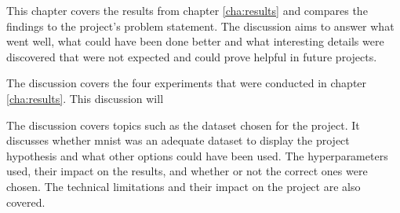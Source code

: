 This chapter covers the results from chapter \autoref{cha:results} and compares the findings to the project's problem statement. The discussion aims to answer what went well, what could have been done better and what interesting details were discovered that were not expected and could prove helpful in future projects.

The discussion covers the four experiments that were conducted in chapter \autoref{cha:results}. This discussion will 


The discussion covers topics such as the dataset chosen for the project. It discusses whether \gls{mnist} was an adequate dataset to display the project hypothesis and what other options could have been used. The hyperparameters used, their impact on the results, and whether or not the correct ones were chosen. The technical limitations and their impact on the project are also covered.






